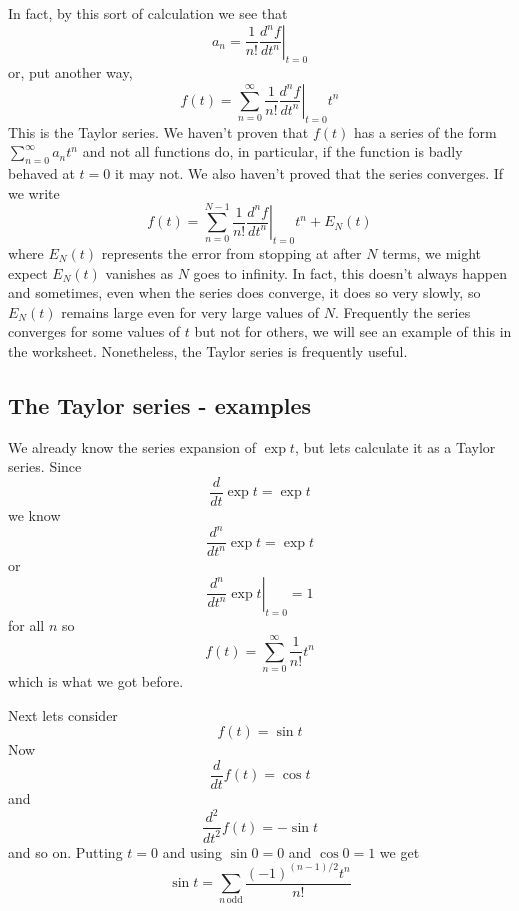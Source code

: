 \documentclass[12pt]{article}
\begin{document}
In fact, by this sort of calculation we see that
\begin{equation}
a_n=\frac{1}{n!}\left.\frac{d^nf}{dt^n}\right|_{t=0}
\end{equation}
or, put another way, 
\begin{equation}
f(t)=\sum_{n=0}^\infty\frac{1}{n!}\left.\frac{d^nf}{dt^n}\right|_{t=0}t^n
\end{equation}
This is the Taylor series. We haven't proven that $f(t)$ has a series
of the form $\sum_{n=0}^\infty a_nt^n$ and not all functions do, in
particular, if the function is badly behaved at $t=0$ it may not. We
also haven't proved that the series converges. If we write
\begin{equation}
f(t)=\sum_{n=0}^{N-1}\frac{1}{n!}\left.\frac{d^nf}{dt^n}\right|_{t=0}t^n+E_N(t)
\end{equation}
where $E_N(t)$ represents the error from stopping at after $N$ terms,
we might expect $E_N(t)$ vanishes as $N$ goes to infinity. In fact,
this doesn't always happen and sometimes, even when the series does
converge, it does so very slowly, so $E_N(t)$ remains large even for
very large values of $N$. Frequently the series converges for some
values of $t$ but not for others, we will see an example of this in
the worksheet. Nonetheless, the Taylor series is frequently useful.

\subsection*{The Taylor series - examples}

We already know the series expansion of $\exp{t}$, but lets calculate
it as a Taylor series. Since 
\begin{equation}
\frac{d}{dt}\exp{t}=\exp{t}
\end{equation}
we know
\begin{equation}
\frac{d^n}{dt^n}\exp{t}=\exp{t}
\end{equation}
or
\begin{equation}
\left.\frac{d^n}{dt^n}\exp{t}\right|_{t=0}=1
\end{equation}
for all $n$ so
\begin{equation}
f(t)=\sum_{n=0}^{\infty}\frac{1}{n!}t^n
\end{equation}
which is what we got before.

Next lets consider
\begin{equation}
f(t)=\sin{t}
\end{equation}
Now 
\begin{equation}
\frac{d}{dt}f(t)=\cos{t}
\end{equation}
and
\begin{equation}
\frac{d^2}{dt^2}f(t)=-\sin{t}
\end{equation}
and so on. Putting $t=0$ and using $\sin{0}=0$ and $\cos{0}=1$ we get
\begin{equation}
\sin{t}=\sum_{n\,\mbox{odd}}\frac{(-1)^{(n-1)/2}t^n}{n!}
\end{equation}
\end{document}
